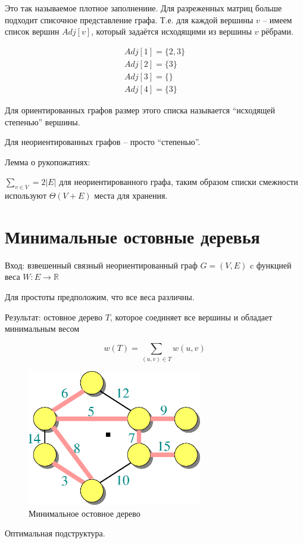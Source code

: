 \documentclass[a4paper,11pt]{article}
\begin{document}
Это так называемое плотное заполнениие. Для разреженных матриц больше подходит
списочное представление графа. Т.е. для каждой вершины $v$ -- имеем список
вершин $Adj[v]$, который задаётся исходящими из вершины $v$ рёбрами.

\begin{gather*}
Adj[1] = \{ 2, 3 \} \\
Adj[2] = \{ 3 \} \\
Adj[3] = \{ \} \\
Adj[4] = \{ 3 \} 
\end{gather*}

Для ориентированных графов размер этого списка называется ``исходящей степенью''
вершины.

Для неориентированных графов -- просто ``степенью''.

Лемма о рукопожатиях:

$\sum_{ v \in V}{} = 2|E| $ для неориентированного графа, таким образом
списки смежности используют $\Theta(V + E)$ места для хранения.

\section{Минимальные остовные деревья}
Вход: взвешенный связный неориентированный граф $G = (V, E)$ c функцией веса $W
\colon E \to \mathbb{R}$

Для простоты предположим, что все веса различны.

Результат: остовное дерево $T$, которое соединяет все вершины и обладает минимальным
весом

$$
w(T) = \sum_{(u,v) \in T} w(u, v)
$$

\begin{figure}[ht]
  \centering
  \includegraphics[width=3in]{lecture16/graph-mst.eps}
  \caption{Минимальное остовное дерево}
  \label{fig:mst}
\end{figure}

Оптимальная подструктура.
\end{document}
